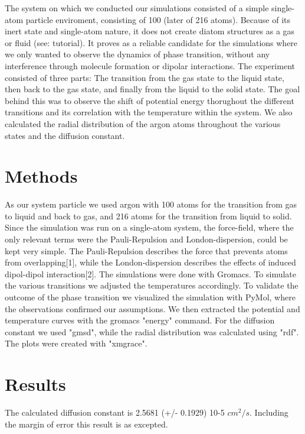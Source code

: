 \documentclass[10pt, a4paper, oneside, twocolumn]{report}
\begin{document}
The system on which we conducted our simulations consisted of a simple single-atom particle enviroment, consisting of 100 (later of 216 atoms). Because of its inert state and single-atom nature, it does not create diatom structures as a gas or fluid (see: tutorial). It proves as a reliable candidate for the simulations where we only wanted to observe the dynamics of phase transition, without any interference through molecule formation or dipolar interactions. The experiment consisted of three parts:
The transition from the gas state to the liquid state, then back to the gas state, and finally from the liquid to the solid state. The goal behind this was to observe the shift of potential energy thorughout the different transitions and its correlation with the temperature within the system. We also calculated the radial distribution of the argon atoms throughout the various states and the diffusion constant.

\section{Methods}

As our system particle we used argon with 100 atoms for the transition from gas to liquid and back to gas, and 216 atoms for the transition from liquid to solid. Since the simulation was run on a single-atom system, the force-field, where the only relevant terms were the Pauli-Repulsion and London-dispersion, could be kept very simple. The Pauli-Repulsion describes the force that prevents atoms from overlapping[1], while the London-dispersion describes the effects of induced dipol-dipol interaction[2]. The simulations were done with Gromacs. To simulate the various transitions we adjusted the temperatures accordingly. To validate
the outcome of the phase transition we visualized the simulation with PyMol, where the observations confirmed our assumptions.
We then extracted the potential and temperature curves with the gromacs "energy" command. For the diffusion constant we used "gmsd", while the radial distribution was calculated using "rdf". The plots were created with "xmgrace".

\section{Results}

The calculated diffusion constant is 2.5681 (+/- 0.1929) 10-5 \(cm^2/s\). Including the margin of error this result is as excepted. 
\end{document}
